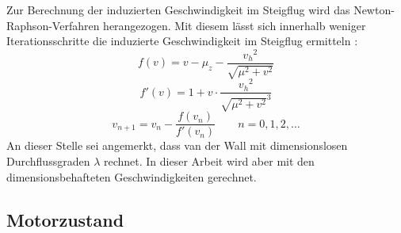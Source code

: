 Zur Berechnung der induzierten Geschwindigkeit im Steigflug wird das Newton-Raphson-Verfahren herangezogen. Mit diesem lässt sich innerhalb weniger Iterationsschritte die induzierte Geschwindigkeit im Steigflug ermitteln \cite[S.153]{Wall.2015}:
\begin{equation}
	f(v) = v-\mu_z-\frac{{v_h}^2}{\sqrt{\mu^2+v^2}}
\end{equation}
\begin{equation}
	f'(v) = 1 + v\cdot\frac{{v_h}^2}{\sqrt{\mu^2+v^2}^3}
\end{equation}
\begin{equation}
	v_{n+1} = v_n - \frac{f(v_n)}{f'(v_n)}\qquad n = 0,1,2,\dots
\end{equation}
An dieser Stelle sei angemerkt, dass van der Wall mit dimensionslosen Durchflussgraden \ensuremath{\lambda} rechnet. In dieser Arbeit wird aber mit den dimensionsbehafteten Geschwindigkeiten gerechnet.




\subsection{Motorzustand}
\label{subsec:motorzustand}


